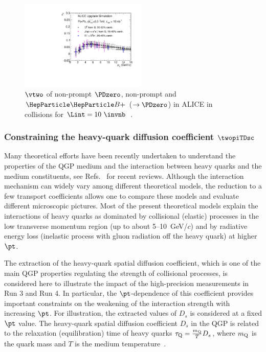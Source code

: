 \begin{figure}[ht]
  \begin{center}
    \includegraphics[width=0.54\textwidth]{hf/figures/ALICEUpgrade_beautyv2.pdf}
    \caption{$\vtwo$ of non-prompt $\PDzero$, non-prompt \PJGy and $\PBp$ ($\rightarrow \PDzero$) in ALICE in \PbPb collisions for $\Lint=10~\invnb$~\cite{Abelev:1625842}.}
    \label{fig:RAAv2.v2beauty}
  \end{center}
\end{figure}

\subsubsection{Constraining the heavy-quark diffusion coefficient $\twopiTDsc$}
\label{sec:HFDs}

Many theoretical efforts have been recently undertaken to understand the properties of the QGP medium and the interaction between heavy quarks and the medium constituents, see Refs.~\cite{Andronic:2015wma,Prino:2016cni,Rapp:2018qla} for recent reviews. 
Although the interaction mechanism can widely vary among different theoretical models, the reduction to a few transport coefficients allows one to compare these models and evaluate different microscopic pictures. 
Most of the present theoretical models explain the interactions of heavy quarks as dominated by collisional (elastic) processes in the low transverse momentum region (up to about 5--10~GeV/$c$) and by radiative energy loss (inelastic process with gluon radiation off the heavy quark) at higher $\pt$.

The extraction of the heavy-quark spatial diffusion coefficient, which is one of the main QGP properties regulating the strength of collisional processes, is considered here to illustrate the impact of the high-precision measurements in Run 3 and Run 4. In particular, the $\pt$-dependence of this coefficient provides important constraints on the weakening of the interaction strength with increasing $\pt$. For illustration, the extracted values of $D_s$ is considered at a fixed $\pt$ value. The heavy-quark spatial diffusion coefficient $D_s$ in the QGP is related to the relaxation (equilibration) time of heavy quarks $\tau_{\rm Q} = \frac{m_{\rm Q}}{T}D_s$, where $m_{\rm Q}$ is the quark mass and $T$ is the medium temperature~\cite{Moore:2004tg}.  


